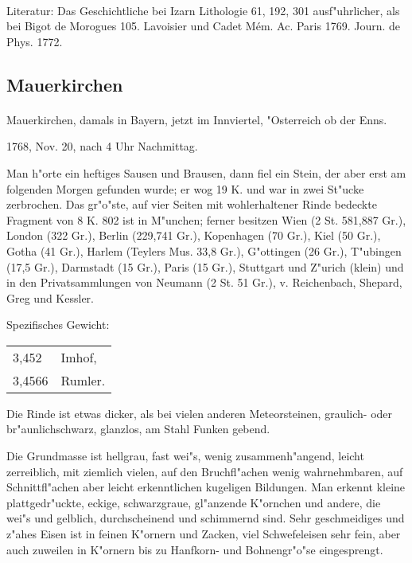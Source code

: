 \documentclass[a4paper, 11pt, oneside]{article}
\begin{document}
\paragraph{}
Literatur: Das Geschichtliche bei Izarn Lithologie 61, 192, 301 ausf"uhrlicher, als bei Bigot de Morogues 105. Lavoisier und Cadet Mém. Ac. Paris 1769. Journ. de Phys. 1772.
\subsection{Mauerkirchen}
\normalsize
\paragraph{}
Mauerkirchen, damals in Bayern, jetzt im Innviertel, "Osterreich ob der Enns.

1768, Nov. 20, nach 4 Uhr Nachmittag.

Man h"orte ein heftiges Sausen und Brausen, dann fiel ein Stein, der aber erst am folgenden Morgen gefunden wurde; er wog 19 K. und war in zwei St"ucke zerbrochen. Das gr"o"ste, auf vier Seiten mit wohlerhaltener Rinde bedeckte Fragment von 8 K. 802 ist in M"unchen; ferner besitzen Wien (2 St. 581,887 Gr.), London (322 Gr.), Berlin (229,741 Gr.), Kopenhagen (70 Gr.), Kiel (50 Gr.), Gotha (41 Gr.), Harlem (Teylers Mus. 33,8 Gr.), G"ottingen (26 Gr.), T"ubingen (17,5 Gr.), Darmstadt (15 Gr.), Paris (15 Gr.), Stuttgart und Z"urich (klein) und in den Privatsammlungen von Neumann (2 St. 51 Gr.), v. Reichenbach, Shepard, Greg und Kessler.

Spezifisches Gewicht:
\begin{table}[!ht]
    \centering
    \begin{tabular}{l l}
        3,452 & Imhof,\\
        3,4566 & Rumler.
    \end{tabular}
\end{table}

Die Rinde ist etwas dicker, als bei vielen anderen Meteorsteinen, graulich- oder br"aunlichschwarz, glanzlos, am Stahl Funken gebend.

Die Grundmasse ist hellgrau, fast wei"s, wenig zusammenh"angend, leicht zerreiblich, mit ziemlich vielen, auf den Bruchfl"achen wenig wahrnehmbaren, auf Schnittfl"achen aber leicht erkenntlichen kugeligen Bildungen. Man erkennt kleine plattgedr"uckte, eckige, schwarzgraue, gl"anzende K"ornchen und andere, die wei"s und gelblich, durchscheinend und schimmernd sind. Sehr geschmeidiges und z"ahes Eisen ist in feinen K"ornern und Zacken, viel Schwefeleisen sehr fein, aber auch zuweilen in K"ornern bis zu Hanfkorn- und Bohnengr"o"se eingesprengt.
\end{document}
